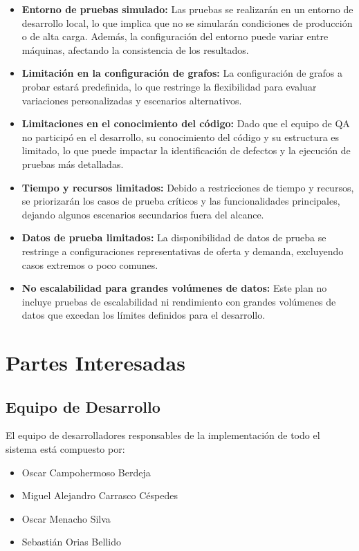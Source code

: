 \documentclass[stu, 12pt, letterpaper, donotrepeattitle, floatsintext, natbib]{apa7}
\begin{document}
\begin{itemize}

    \item \textbf{Entorno de pruebas simulado:} Las pruebas se realizarán en un entorno de desarrollo local, lo que implica que no se simularán condiciones de producción o de alta carga. Además, la configuración del entorno puede variar entre máquinas, afectando la consistencia de los resultados.

    \item \textbf{Limitación en la configuración de grafos:} La configuración de grafos a probar estará predefinida, lo que restringe la flexibilidad para evaluar variaciones personalizadas y escenarios alternativos.


    \item \textbf{Limitaciones en el conocimiento del código:} Dado que el equipo de QA no participó en el desarrollo, su conocimiento del código y su estructura es limitado, lo que puede impactar la identificación de defectos y la ejecución de pruebas más detalladas.

    \item \textbf{Tiempo y recursos limitados:} Debido a restricciones de tiempo y recursos, se priorizarán los casos de prueba críticos y las funcionalidades principales, dejando algunos escenarios secundarios fuera del alcance.

    \item \textbf{Datos de prueba limitados:} La disponibilidad de datos de prueba se restringe a configuraciones representativas de oferta y demanda, excluyendo casos extremos o poco comunes.

    \item \textbf{No escalabilidad para grandes volúmenes de datos:} Este plan no incluye pruebas de escalabilidad ni rendimiento con grandes volúmenes de datos que excedan los límites definidos para el desarrollo.
\end{itemize}


\section{\large Partes Interesadas}

\subsection{Equipo de Desarrollo} 
El equipo de desarrolladores responsables de la implementación de todo el sistema está compuesto por:
    \begin{itemize}
        \item Oscar Campohermoso Berdeja
        \item Miguel Alejandro Carrasco Céspedes
        \item Oscar Menacho Silva
        \item Sebastián Orias Bellido
    \end{itemize}
\end{document}
